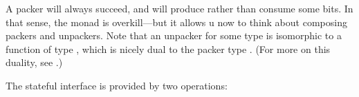 \documentclass[fleqn,runningheads]{llncs}
\begin{document}
A packer will always succeed, and will produce rather than consume some bits. In that sense, the  monad is overkill---but it allows u now to think about composing packers and unpackers. Note that an unpacker \AgdaSpace{} for some type  is isomorphic to a function of type
\AgdaSpace{}%
\AgdaSpace{}%
\AgdaSpace{}%
,
which is nicely dual to the packer type
\AgdaSpace{}%
\AgdaSpace{}%
\AgdaSpace{}%
.
%
(For more on this duality, see \cite{janssonjeuring2002a}.)

The stateful interface is provided by two operations:
\begin{code}[hide]%
\>[0]\AgdaSpace{}%
\AgdaSpace{}%
\<%
\\
\>[0]\<%
\\
\>[0][@{}l@{\AgdaIndent{0}}]%
\>[2]\AgdaSpace{}%
\AgdaSymbol{=}\AgdaSpace{}%
\<%
\\
\>[0]\<%
\end{code}
\begin{code}%
\>[0]\AgdaSpace{}%
\AgdaSymbol{:}\AgdaSpace{}%
\AgdaSpace{}%
\AgdaSymbol{(}\AgdaSpace{}%
\AgdaSymbol{)}\<%
\\
\>[0]\AgdaSpace{}%
\AgdaSpace{}%
\AgdaSymbol{=}\AgdaSpace{}%
\AgdaSpace{}%
\AgdaSpace{}%
\AgdaSpace{}%
\AgdaSpace{}%
\AgdaSymbol{(}\AgdaSpace{}%
\AgdaOperator{\AgdaInductiveConstructor{,}}\AgdaSpace{}%
\AgdaSymbol{)}\<%
\\
%
\\[\AgdaEmptyExtraSkip]%
\>[0]\AgdaSpace{}%
\AgdaSymbol{:}\AgdaSpace{}%
\AgdaSpace{}%
\AgdaSymbol{(}\AgdaSpace{}%
\AgdaSymbol{)}\<%
\\
\>[0]\AgdaSpace{}%
\AgdaSymbol{=}\AgdaSpace{}%
\AgdaSpace{}%
\AgdaSpace{}%
\AgdaSpace{}%
\AgdaSpace{}%
\AgdaSymbol{(}\AgdaSpace{}%
\AgdaOperator{\AgdaInductiveConstructor{,}}\AgdaSpace{}%
\AgdaSymbol{)}\<%
\end{code}
\end{document}
